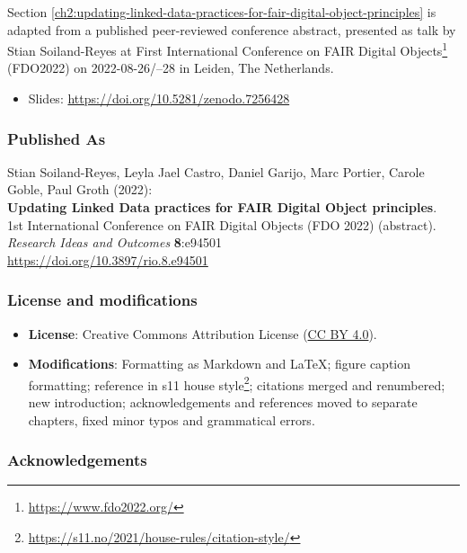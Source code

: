 Section \ref{ch2:updating-linked-data-practices-for-fair-digital-object-principles} is adapted from a published peer-reviewed conference abstract,
presented as talk by Stian Soiland-Reyes at 
First International Conference on FAIR Digital Objects\footnote{\url{https://www.fdo2022.org/}} 
(FDO2022) on
2022-08-26/--28 in Leiden, The Netherlands. 


\begin{itemize}
    \item Slides: \url{https://doi.org/10.5281/zenodo.7256428}
\end{itemize}

\subsubsection*{Published As}

Stian Soiland-Reyes, Leyla Jael Castro, Daniel Garijo, Marc Portier, Carole Goble, Paul Groth (2022):\\
\textbf{Updating Linked Data practices for FAIR Digital Object principles}.\\
1st International Conference on FAIR Digital Objects (FDO 2022) (abstract).\\
\textit{Research Ideas and Outcomes} \textbf{8}:e94501\\
\url{https://doi.org/10.3897/rio.8.e94501}


\subsubsection*{License and modifications}

\begin{itemize}
\tightlist
\item
  \textbf{License}: Creative Commons Attribution License
  (\href{https://spdx.org/licenses/CC-BY-4.0}{CC BY 4.0}).
\item
  \textbf{Modifications}: Formatting as Markdown and LaTeX; figure caption
		formatting; reference in s11 house style\footnote{\url{https://s11.no/2021/house-rules/citation-style/}}; citations merged and renumbered; new introduction;
  acknowledgements and references moved to separate chapters, fixed minor typos and grammatical errors.
\end{itemize}

\subsubsection*{Acknowledgements}


